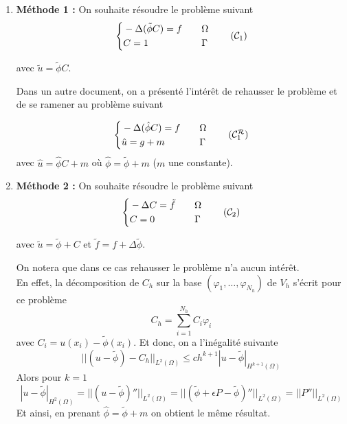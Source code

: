 \begin{enumerate}[label=\textbullet]
	\item \textbf{Méthode 1 : }
	On souhaite résoudre le problème suivant
	\begin{equation}
		\label{pbc1}
		\left\{\begin{aligned}
			&-\Delta (\tilde{\phi}C)=f \quad &&\Omega \\
			&C=1 \quad &&\Gamma
		\end{aligned}\right. \tag{$\mathcal{C}_1$}
	\end{equation}
	
	avec $\tilde{u}=\tilde{\phi}C$.
	
	Dans un autre document, on a présenté l'intérêt de rehausser le problème et de se ramener au problème suivant
	
	\begin{equation}
		\left\{\begin{aligned}
			&-\Delta (\hat{\phi}C)=f \quad &&\Omega \\
			&\hat{u}=g+m \quad &&\Gamma
		\end{aligned}\right. \label{pbc1r} \tag{$\mathcal{C}_1^\mathcal{R}$}
	\end{equation}
	avec $\hat{u}=\hat{\phi}C+m$ où $\hat{\phi}=\tilde{\phi}+m$ ($m$ une constante).
	
	
	\item \textbf{Méthode 2 : } On souhaite résoudre le problème suivant
	\begin{equation}
		\label{pbc2}
		\left\{\begin{aligned}
			&-\Delta C=\tilde{f} \quad &&\Omega \\
			&C=0 \quad &&\Gamma
		\end{aligned}\right. \tag{$\mathcal{C}_2$}
	\end{equation}
	
	avec $\tilde{u}=\tilde{\phi}+C$ et $\tilde{f}=f+\Delta\tilde{\phi}$.
	
	\begin{Rem}
		On notera que dans ce cas rehausser le problème n'a aucun intérêt. \\
		En effet, la décomposition de $C_h$ sur la base $(\varphi_1,\dots,\varphi_{N_h})$ de $V_h$ s'écrit pour ce problème			
		$$C_h=\sum_{i=1}^{N_h}C_i\varphi_i$$
		avec $C_i=u(x_i)-\tilde{\phi}(x_i)$.
		Et donc, on a l'inégalité suivante
		$$||(u-\tilde{\phi})-C_h||_{L^2(\Omega)}\le ch^{k+1}|u-\tilde{\phi}|_{H^{k+1}(\Omega)}$$
		Alors pour $k=1$
		$$|u-\tilde{\phi}|_{H^2(\Omega)}=||(u-\tilde{\phi})''||_{L^2(\Omega)}=||(\tilde{\phi}+\epsilon P-\tilde{\phi})''||_{L^2(\Omega)}=||P''||_{L^2(\Omega)}$$
		Et ainsi, en prenant $\hat{\phi}=\tilde{\phi}+m$ on obtient le même résultat.
	\end{Rem}
\end{enumerate}

